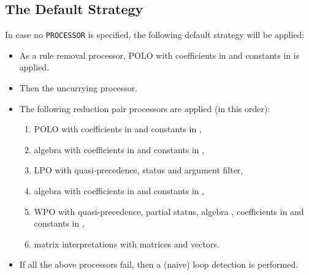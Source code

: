 \documentclass{llncs}
\begin{document}
\subsection{The Default Strategy}
\label{sec:default}
In case no \texttt{PROCESSOR} is specified,
the following default strategy will be applied:
\begin{itemize}
\item
	As a rule removal processor,
	POLO with coefficients in  and constants in  is applied.
\item
	Then the uncurrying processor.
\item
	The following reduction pair processors are applied (in this order):
	\smallskip
	\begin{enumerate}
	\item POLO with coefficients in  and constants in ,
	\item algebra  with coefficients in  and constants in ,
	\item LPO with quasi-precedence,
		status and argument filter,
	\item algebra  with coefficients in  and constants in ,
	\item WPO with
		quasi-precedence, partial status,
		algebra , coefficients in  and constants in ,
	\item matrix interpretations
		with  matrices and  vectors.
	\end{enumerate}
	\smallskip
\item
	If all the above processors fail, then a (naive) loop detection is performed.
\end{itemize}
\end{document}

